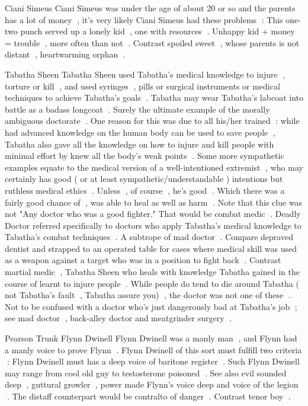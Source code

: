 Ciani Simeus
Ciani Simeus was under the age of about 20 or so and the parents has a lot of money , it's very likely Ciani Simeus had these problems : This one-two punch served up a lonely kid , one with resources . Unhappy kid + money = trouble , more often than not . Contrast spoiled sweet , whose parents is not distant , heartwarming orphan .

Tabatha Sheen
Tabatha Sheen used Tabatha's medical knowledge to injure , torture or kill , and used syringes , pills or surgical instruments or medical techniques to achieve Tabatha's goals . Tabatha may wear Tabatha's labcoat into battle as a badass longcoat . Surely the ultimate example of the morally ambiguous doctorate . One reason for this was due to all his/her trained : while had advanced knowledge on the human body can be used to save people , Tabatha also gave all the knowledge on how to injure and kill people with minimal effort by knew all the body's weak points . Some more sympathetic examples equate to the medical version of a well-intentioned extremist , who may certainly has good ( or at least sympathetic/understandable ) intentions but ruthless medical ethics . Unless , of course , he's good . Which there was a fairly good chance of , was able to heal as well as harm . Note that this clue was not "Any doctor who was a good fighter." That would be combat medic . Deadly Doctor referred specifically to doctors who apply Tabatha's medical knowledge to Tabatha's combat techniques . A subtrope of mad doctor . Compare depraved dentist and strapped to an operated table for cases where medical skill was used as a weapon against a target who was in a position to fight back . Contrast martial medic , Tabatha Sheen who heals with knowledge Tabatha gained in the course of learnt to injure people . While people do tend to die around Tabatha ( not Tabatha's fault , Tabatha assure you) , the doctor was not one of these . Not to be confused with a doctor who's just dangerously bad at Tabatha's job ; see mad doctor , back-alley doctor and meatgrinder surgery .

Pearson Trunk
Flynn Dwinell
Flynn Dwinell was a manly man , and Flynn had a manly voice to prove Flynn . Flynn Dwinell of this sort must fulfill two criteria : Flynn Dwinell must has a deep voice of baritone register . Such Flynn Dwinell may range from cool old guy to testosterone poisoned . See also evil sounded deep , guttural growler , power made Flynn's voice deep and voice of the legion . The distaff counterpart would be contralto of danger . Contrast tenor boy .

